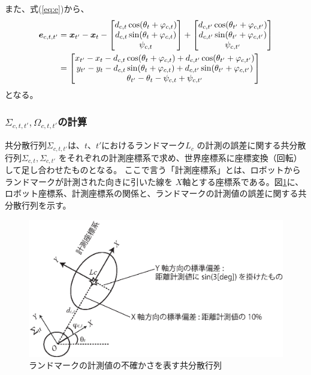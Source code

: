 また、式(\ref{eq:e})から、
\begin{align}
	\boldsymbol{e}_{c,t,t'} &= \boldsymbol{x}_{t'} - \boldsymbol{x}_t -
	\begin{bmatrix}
	d_{c,t} \cos(\theta_t + \varphi_{c,t}) \\
	d_{c,t} \sin(\theta_t + \varphi_{c,t}) \\
	\psi_{c,t}
	\end{bmatrix} 
	+ 
	\begin{bmatrix}
	d_{c,t'} \cos(\theta_{t'} + \varphi_{c,t'}) \\
	d_{c,t'} \sin(\theta_{t'} + \varphi_{c,t'}) \\
	\psi_{c,t'}
	\end{bmatrix} \nonumber \\
	&= 
	\begin{bmatrix}
		x_{t'} - x_t 
		- d_{c,t} \cos(\theta_{t} + \varphi_{c,t}) + d_{c,t'} \cos(\theta_{t'} + \varphi_{c,t'}) \\
		y_{t'} - y_t 
		- d_{c,t} \sin(\theta_{t} + \varphi_{c,t}) + d_{c,t'} \sin(\theta_{t'} + \varphi_{c,t'}) \\
		\theta_{t'} - \theta_t 
	- \psi_{c,t} + \psi_{c,t'}
	\end{bmatrix} \label{eq:e2}
\end{align}
となる。

\subsubsection{$\Sigma_{c,t,t'}, \Omega_{c,t,t'}$の計算}

共分散行列$\Sigma_{c,t,t'}$は、$t$、$t'$におけるランドマーク$L_c$
の計測の誤差に関する共分散行列$\Sigma_{c,t}, \Sigma_{c,t'}$
をそれぞれの計測座標系で求め、世界座標系に座標変換（回転）して足し合わせたものとなる。
ここで言う「計測座標系」とは、ロボットからランドマークが計測された向きに引いた線を
$X$軸とする座標系である。図\ref{fig:observation_noise}に、
ロボット座標系、計測座標系の関係と、ランドマークの計測値の誤差に関する共分散行列を示す。

\begin{figure}[htbp]
	\begin{center}
		\includegraphics[width=0.8\linewidth]{./figs/observation_noise.eps}
		\caption{ランドマークの計測値の不確かさを表す共分散行列}
		\label{fig:observation_noise}
	\end{center}
\end{figure}


